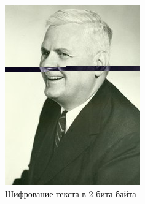\documentclass[10pt,a4paper,final]{article} %
\begin{document}
\begin{figure}[h!]
\begin{minipage}{0.3\textwidth}
		\includegraphics[width=\linewidth]{img/Haskell_2 (1)}
		\caption{Шифрование текста в 2 бита байта}
	\end{minipage}
\end{figure}
\end{document}
